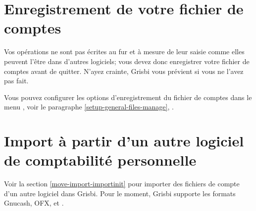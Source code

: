 

\section{Enregistrement de votre fichier de comptes\label{start-save}}


Vos opérations ne sont pas écrites au fur et à mesure de leur saisie comme elles peuvent l'être dans d'autres logiciels; vous devez donc enregistrer votre fichier de comptes avant de quitter. N'ayez crainte, Grisbi vous prévient si vous ne l'avez pas fait. 

Vous pouvez configurer les options d'enregistrement du fichier de comptes dans le menu , voir le paragraphe \vref{setup-general-files-manage}, .


\section{Import à partir d'un autre logiciel de comptabilité personnelle}

Voir la section \vref{move-import-importinit} pour importer des fichiers de compte d'un autre logiciel dans Grisbi. Pour le moment, Grisbi supporte les formats \gls{Gnucash}, \gls{OFX},  et .



